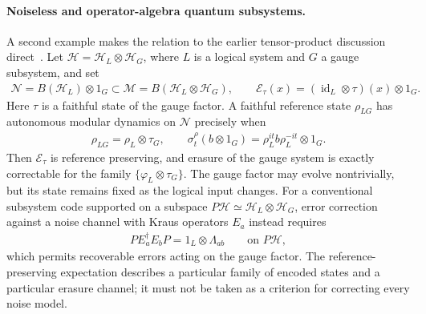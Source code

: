 \documentclass[a4paper,11pt]{article}
\theoremstyle{definition}
\newcommand{\cH}{\mathcal{H}}
\newcommand{\mN}{\mathcal{N}}
\newcommand{\mM}{\mathcal{M}}
\newcommand{\mE}{\mathcal{E}}
\begin{document}
\paragraph{Noiseless and operator-algebra quantum subsystems.}
A second example makes the relation to the earlier tensor-product
discussion direct~\cite{KribsLaflammePoulin2005,BenyKempfKribs2007}.
Let $\cH=\cH_L\otimes\cH_G$, where $L$ is a logical system and $G$ a
gauge subsystem, and set
\begin{align}
 \mN=B(\cH_L)\otimes1_G\subset
 \mM=B(\cH_L\otimes\cH_G),\qquad
 \mE_\tau(x)=(\operatorname{id}_L\otimes\tau)(x)\otimes1_G .
 \label{eq:subsystem-gauge-expectation}
\end{align}
Here $\tau$ is a faithful state of the gauge factor. A faithful
reference state $\rho_{LG}$ has autonomous modular dynamics on $\mN$
precisely when
\begin{align}
 \rho_{LG}=\rho_L\otimes\tau_G,
 \qquad
 \sigma_t^\rho(b\otimes1_G)
   =\rho_L^{it}b\rho_L^{-it}\otimes1_G .
 \label{eq:subsystem-gauge-product}
\end{align}
Then $\mE_\tau$ is reference preserving, and erasure of the gauge
system is exactly correctable for the family $\{\varphi_L\otimes\tau_G\}$.
The gauge factor may evolve nontrivially, but its state remains fixed as
the logical input changes. For a conventional subsystem code supported
on a subspace $P\cH\simeq\cH_L\otimes\cH_G$, error correction against
a noise channel with Kraus operators $E_a$ instead requires
\begin{align}
 P E_a^\dagger E_bP=1_L\otimes\Lambda_{ab}
 \qquad\text{on }P\cH,
 \label{eq:subsystem-KL}
\end{align}
which permits recoverable errors acting on the gauge factor. The
reference-preserving expectation describes a particular family of
encoded states and a particular erasure channel; it must not be taken as
a criterion for correcting every noise model.
\end{document}

